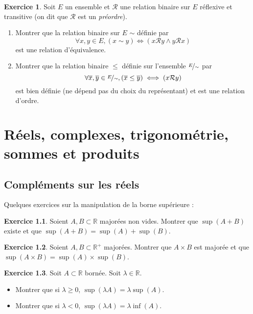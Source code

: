 \documentclass[12pt,a4paper]{book}
\theoremstyle{definition}
\newtheorem{exo}{Exercice}[section]
\theoremstyle{remark}
\newcommand{\R}{\mathbb{R}}
\begin{document}
\begin{exo}
    Soit $E$ un ensemble et $\mathcal{R}$ une relation binaire sur $E$ réflexive et transitive (on dit que $\mathcal{R}$ est un \emph{préordre}).
    \begin{enumerate}
        \item Montrer que la relation binaire sur $E$ $\sim$ définie par
        \[\forall x,y\in E, (x \sim y) \iff (x\mathcal{R}y \wedge y \mathcal{R}x)\]
        est une relation d'équivalence.
        \item Montrer que la relation binaire $\le$ définie sur l'ensemble $\nicefrac{E}{\sim}$ par
        \[\forall \overline{x},\overline{y} \in \nicefrac{E}{\sim}, (\overline{x} \le \overline{y}) \iff (x\mathcal{R}y) \]
        est bien définie (ne dépend pas du choix du représentant) et est une relation d'ordre.
    \end{enumerate}
\end{exo}

\chapter{Réels, complexes, trigonométrie, sommes et produits}

\section{Compléments sur les réels}

Quelques exercices sur la manipulation de la borne supérieure :

\begin{exo}
    Soient $A,B \subset \R$ majorées non vides. Montrer que $\sup(A+B)$ existe et que $\sup(A+B) = \sup(A) + \sup(B)$.
\end{exo}

\begin{exo}
    Soient $A,B \subset \R^+$ majorées. Montrer que $A\times B$ est majorée et que $\sup(A\times B)=\sup(A)\times\sup(B)$.
\end{exo}

\begin{exo}
    Soit $A \subset \R$ bornée. Soit $\lambda \in \R$.
    \begin{itemize}
        \item Montrer que si $\lambda \ge 0$, $\sup (\lambda A) = \lambda \sup (A)$.
        \item Montrer que si $\lambda < 0$, $\sup (\lambda A) = \lambda \inf (A)$.
    \end{itemize}
\end{exo}
\end{document}

